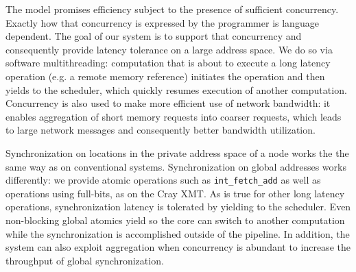 \documentclass[10pt,nocopyrightspace]{sigplanconf}
\begin{document}


The model promises efficiency subject to the presence of sufficient
concurrency.  Exactly how that concurrency is expressed by the
programmer is language dependent. The goal of our system is to support
that concurrency and consequently provide latency tolerance on a large
address space. We do so via software multithreading: computation that
is about to execute a long latency operation (e.g. a remote memory
reference) initiates the operation and then yields to the scheduler,
which quickly resumes execution of another computation. Concurrency is
also used to make more efficient use of network bandwidth: it
enables aggregation of short memory requests into coarser requests,
which leads to large network messages and consequently better
bandwidth utilization.


Synchronization on locations in the private address space of a node
works the the same way as on conventional systems.  Synchronization on
global addresses works differently: we provide atomic operations such
as {\tt int\_fetch\_add} as well as operations using full-bits, as on
the Cray XMT.  As is true for other long latency operations,
synchronization latency is tolerated by yielding to the scheduler.
Even non-blocking global atomics yield so the core can switch to
another computation while the synchronization is accomplished outside
of the pipeline.  In addition, the system can also exploit aggregation
when concurrency is abundant to increase the throughput of global
synchronization.
\end{document}
